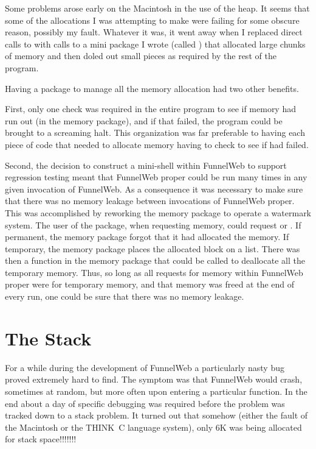 \topicbreak

Some problems arose early on the Macintosh
in the use of the heap. It seems
that some of the allocations I was attempting to make were failing for some
obscure reason, possibly my fault. Whatever it was, it went away when I
replaced direct calls to 
with calls to a mini package I wrote
(called ) that allocated large chunks of memory and then doled out
small pieces as required by the rest of the
program.

Having a package to manage all the memory allocation had two other benefits.

First, only one check was required in the entire program to see if memory
had run out (in the memory package), and if that failed, the program could
be brought to a screaming halt. This organization was far preferable to
having each piece of code that needed to allocate memory having to check
to see if  had failed.

Second, the decision to construct a mini-shell within FunnelWeb to
support regression testing meant that FunnelWeb proper could be run
many times in any given invocation of FunnelWeb. As a consequence it was
necessary to make sure that there was no memory
leakage between invocations
of FunnelWeb proper. This was accomplished by reworking the memory package
to operate a watermark system. The user of the package, when requesting
memory, could request  or . If permanent, the
memory package forgot that it had allocated the memory. If temporary, the
memory package places the allocated block on a list. There was then a
function in the memory package that could be called to deallocate all the
temporary memory. Thus, so long as all requests for memory within FunnelWeb
proper were for temporary memory, and that memory was freed at the end of
every run, one could be sure that there was no memory leakage.

\section{The Stack}

For a while during the development of FunnelWeb a particularly nasty bug
proved extremely hard to find. The symptom was that FunnelWeb would crash,
sometimes at random, but more often upon entering a particular function.
In the end about a day of specific debugging was required before the problem
was tracked down to a stack problem. It turned out that somehow
(either the fault of the Macintosh or the THINK~C language system), only
6K was being allocated for stack space!!!!!!!

